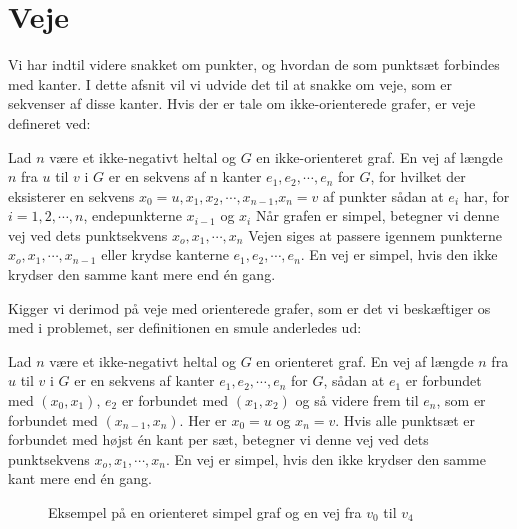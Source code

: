 
\section{Veje}
Vi har indtil videre snakket om punkter, og hvordan de som punktsæt forbindes med kanter. I dette afsnit vil vi udvide det til at snakke om veje, som er sekvenser af disse kanter. Hvis der er tale om ikke-orienterede grafer, er veje defineret ved:
\begin{defn}
[Veje] 
Lad $n$ være et ikke-negativt heltal og $G$ en ikke-orienteret graf. En vej af længde $n$ fra $u$ til $v$ i $G$ er en sekvens af n kanter $e_{1},e_{2},\cdots,e_{n}$ for $G$, for hvilket der eksisterer en sekvens $x_{0}=u,x_{1},x_{2},\cdots,x_{n-1}$,$x_{n}=v$ af punkter sådan at $e_{i}$ har, for $i=1,2,\cdots,n$, endepunkterne $x_{i-1}$ og $x_{i}$ Når grafen er simpel, betegner vi denne  vej ved dets punktsekvens $x_{o},x_{1},\cdots,x_{n}$ Vejen siges at passere igennem punkterne $x_{o},x_{1},\cdots,x_{n-1}$ eller krydse kanterne $e_{1},e_{2},\cdots,e_{n}$. En vej er simpel, hvis den ikke krydser den samme kant mere end én gang.
\end{defn}
Kigger vi derimod på veje med orienterede grafer, som er det vi beskæftiger os med i problemet, ser definitionen en smule anderledes ud:
\begin{defn}
[Veje] 
Lad $n$ være et ikke-negativt heltal og $G$ en orienteret graf. En vej af længde $n$ fra $u$ til $v$ i $G$ er en sekvens af kanter $e_{1},e_{2},\cdots,e_{n}$ for $G$, sådan at $e_{1}$ er forbundet med $(x_{0},x_{1})$, $e_{2}$ er forbundet med $(x_{1},x_{2})$ og så videre frem til $e_{n}$, som er forbundet med $(x_{n-1},x_{n})$. Her er $x_{0}=u$ og $x_{n}=v$. Hvis alle punktsæt er forbundet med højst én kant per sæt, betegner vi denne  vej ved dets punktsekvens $x_{o},x_{1},\cdots,x_{n}$. En vej er simpel, hvis den ikke krydser den samme kant mere end én gang.
\end{defn}

\begin{figure}[H]
\centering
	\caption{Eksempel på en orienteret simpel graf og en vej fra $v_{0}$ til $v_{4}$}
	\label{fig.vaegtetopg}
\end{figure}


